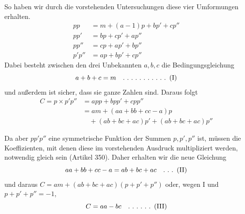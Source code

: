 So haben wir durch die vorstehenden Untersuchungen diese vier Umformungen erhalten.
\[\begin{aligned}pp&=m+(a-1)p+bp'+cp''\\pp'&=bp+cp'+ap''\\pp''&=cp+ap'+bp''\\p'p''&=ap+bp'+cp''\end{aligned}\] Dabei besteht zwischen den drei Unbekannten \(a,\allowbreak b,\allowbreak c\) die Bedingungsgleichung \[a+b+c=m\quad \ldotp\,\ldotp\,\ldotp\,\ldotp\,\ldotp\,\ldotp\,\ldotp\,\ldotp\,\ldotp\,\ldotp\,\ldotp\ (\mathrm{I})\] und außerdem ist sicher, dass sie ganze Zahlen sind. Daraus folgt \[\begin{aligned}C=p\times p'p''&=app+bpp'+cpp''\\&=am+(aa+bb+cc-a)p\\&\quad+(ab+bc+ac)p'+(ab+bc+ac)p''\end{aligned}\]

Da aber \(pp'p''\) eine symmetrische Funktion der Summen \(p,\allowbreak p',\allowbreak p''\) ist, müssen die Koeffizienten, mit denen diese im vorstehenden Ausdruck multipliziert werden, notwendig gleich sein (Artikel 350). Daher erhalten wir die neue Gleichung \[aa+bb+cc-a=ab+bc+ac\quad \ldotp\,\ldotp\,\ldotp\ (\mathrm{II})\] und daraus \(C=am+(ab+bc+ac)(p+p'+p'')\) oder, wegen I und \(p+p'+p''=-1\), \[C=aa-bc\quad \ldotp\,\ldotp\,\ldotp\,\ldotp\,\ldotp\,\ldotp\ (\mathrm{III})\]

